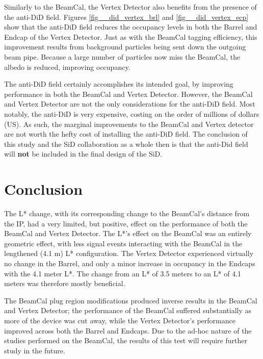 \documentclass{report}
\begin{document}
                Similarly to the BeamCal, the Vertex Detector also benefits from the presence of the anti-DiD field. Figures \ref{fig__did_vertex_brl} and \ref{fig__did_vertex_ecp} show that the anti-DiD field reduces the occupancy levels in both the Barrel and Endcap of the Vertex Detector. Just as with the BeamCal tagging efficiency, this improvement results from background particles being sent down the outgoing beam pipe. Because a large number of particles now miss the BeamCal, the albedo is reduced, improving occupancy.

                The anti-DiD field certainly accomplishes its intended goal, by improving performance in both the BeamCal and Vertex Detector. However, the BeamCal and Vertex Detector are not the only considerations for the anti-DiD field. Most notably, the anti-DiD is very expensive, costing on the order of millions of dollars (US). As such, the marginal improvements to the BeamCal and Vertex detector are not worth the hefty cost of installing the anti-DiD field. The conclusion of this study and the SiD collaboration as a whole then is that the anti-Did field will \textbf{not} be included in the final design of the SiD.


        \newpage
        \section{Conclusion}
            The L* change, with its corresponding change to the BeamCal's distance from the IP, had a very limited, but positive, effect on the performance of both the BeamCal and Vertex Detector. The L*'s effect on the BeamCal was an entirely geometric effect, with less signal events interacting with the BeamCal in the lengthened (4.1 m) L* configuration. The Vertex Detector experienced virtually no change in the Barrel, and only a minor increase in occupancy in the Endcaps with the 4.1 meter L*. The change from an L* of 3.5 meters to an L* of 4.1 meters was therefore mostly beneficial.
            
            The BeamCal plug region modifications produced inverse results in the BeamCal and Vertex Detector; the performance of the BeamCal suffered substantially as more of the device was cut away, while the Vertex Detector's performance improved across both the Barrel and Endcaps. Due to the ad-hoc nature of the studies performed on the BeamCal, the results of this test will require further study in the future.
            
\end{document}

